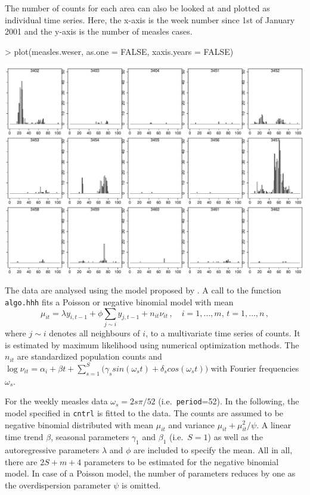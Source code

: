 \documentclass[a4paper,11pt]{article}
\begin{document}
The number of counts for each area can also be looked at and plotted
as individual time series.
Here, the x-axis is the week number since 1st of January 2001 and the 
y-axis is the number of measles cases.

\begin{Schunk}
\begin{Sinput}
> plot(measles.weser, as.one = FALSE, xaxis.years = FALSE)
\end{Sinput}
\end{Schunk}
\includegraphics{figs/vignette-021}
\vspace{1em}

The data are analysed using the model proposed by \citet{held2005}.
A call to the function \texttt{algo.hhh} fits a Poisson or negative binomial
model with mean
\[
  \mu_{it} = \lambda y_{i,t-1} + \phi \sum_{j \sim i} y_{j,t-1} + n_{it} \nu_{it}\, , \quad
  i=1,\ldots,m, \, t=1,\ldots,n \, ,
\]
where $j \sim i$ denotes all neighbours of $i$,
to a multivariate time series of counts.
It is estimated  by maximum likelihood using numerical optimization methods.
The $n_{it}$ are standardized population counts and
$\log \nu_{it} = \alpha_i + \beta t + \sum_{s=1}^{S}\big(\gamma_s sin(\omega_s t)
+ \delta_s cos(\omega_s t)\big)$ with Fourier frequencies $\omega_s$.


For the weekly measles data $\omega_s=2s\pi/52$ (i.e.\ \texttt{period}=52).
In the following, the model specified in \texttt{cntrl}
is fitted to the data. The counts are assumed to be negative binomial distributed
with mean $\mu_{it}$ and variance $\mu_{it} +\mu_{it}^2/\psi$.
A linear time trend $\beta$, seasonal parameters $\gamma_1$ and $\beta_1$ (i.e.\ $S=1$)
as well as the autoregressive parameters $\lambda$ and $\phi$ are included
to specify the mean.
All in all, there are %
$2S+m+4$ parameters to be estimated for the negative binomial model. 
In case of a Poisson model, the number of parameters reduces by one 
as the overdispersion parameter $\psi$ is omitted.
\end{document}
